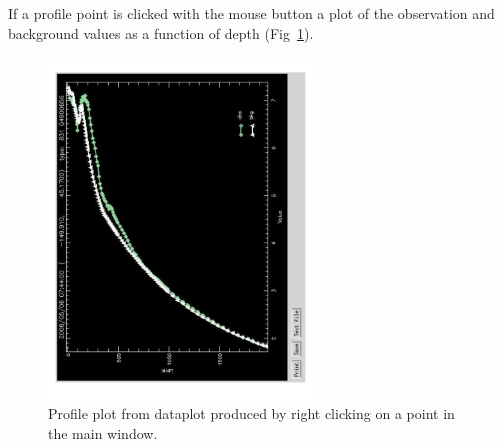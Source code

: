 If a profile point is clicked with the mouse button a plot of the observation and background
values as a function of depth (Fig~\ref{fig:obsdataplotprofile}).

\begin{figure}     \begin{center}
\includegraphics[width=7cm,angle=-90.]{./TexFiles/Figures/Fig_OBS_dataplot_prof}
\caption{      \label{fig:obsdataplotprofile}
Profile plot from dataplot produced by right clicking on a point in the main window.}
\end{center}     \end{figure}




